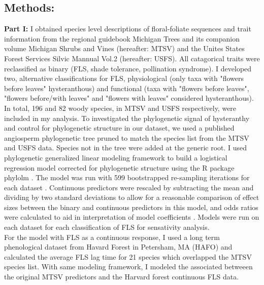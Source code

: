\documentclass{article}\usepackage[]{graphicx}\usepackage[]{color}
\begin{document}
\subsection*{Methods:}
\textbf{Part I:} I obtained species level descriptions of floral-foliate sequences and trait information from the regional guidebook Michigan Trees \citep{Barnes2004} and its companion volume Michigan Shrubs and Vines \citep{Barnes2016} (hereafter: MTSV) and the Unites States Forest Services Silvic Mannual Vol.2 \citep{Burns1990} (hereafter: USFS). All catagorical traits were reclassified as binary (FLS, shade tolerance, pollination syndrome). I developed two, alternative classifications for FLS, physiological (only taxa with "flowers before leaves" hysteranthous) and functional (taxa with "flowers before leaves", "flowers before/with leaves" and "flowers with leaves" considered hysteranthous). In total, 196 and 82 woody species, in MTSV and USFS respectively, were included in my analysis. To investigated the phylogenetic signal of hysteranthy and control for phylogenetic structure in our dataset, we used a published angiosperm phylogenetic tree \citep{Zanne2013} pruned to match the species list from the MTSV  and USFS data. Species not in the tree were added at the generic root. I used phylogenetic generalized linear modeling framework \citep{Ives2010} to build a logistical regression model corrected for phylogenetic structure using the R package phylolm \citep{Ho2014}. The model was run with 599 bootstrapped re-sampling iterations for each dataset \citep{Wilcox2010}. Continuous predictors were rescaled by subtracting the mean and dividing by two standard deviations to allow for a reasonable comparison of effect sizes between the binary and continuous predictors in this model, and odds ratios were calculated to aid in interpretation of model coefficients \citep{Gelman2007}. Models were run on each dataset for each classification of FLS for sensativity analysis.\\ 
\indent For the model with FLS as a continuous response, I used a long term phenological dataset from Havard Forest in Petersham, MA (HAFO) \citep{Okeefe2015} and calculated the average FLS lag time for 21 species which overlapped the MTSV species list. With same modeling framework, I modeled the associated betweeen the original MTSV predictors and the Harvard forest continuous FLS data.
\end{document}
